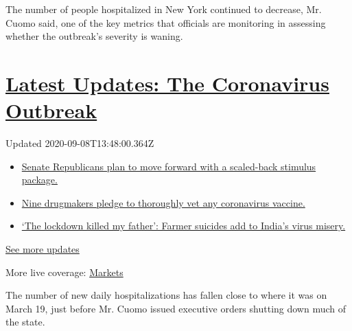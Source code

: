 The number of people hospitalized in New York continued to decrease, Mr.
Cuomo said, one of the key metrics that officials are monitoring in
assessing whether the outbreak's severity is waning.

\hypertarget{latest-updates-the-coronavirus-outbreak}{%
\section{\texorpdfstring{\href{https://www.nytimes3xbfgragh.onion/2020/09/08/world/covid-19-coronavirus.html?action=click\&pgtype=Article\&state=default\&region=MAIN_CONTENT_1\&context=storylines_live_updates}{Latest
Updates: The Coronavirus
Outbreak}}{Latest Updates: The Coronavirus Outbreak}}\label{latest-updates-the-coronavirus-outbreak}}

Updated 2020-09-08T13:48:00.364Z

\begin{itemize}
\tightlist
\item
  \href{https://www.nytimes3xbfgragh.onion/2020/09/08/world/covid-19-coronavirus.html?action=click\&pgtype=Article\&state=default\&region=MAIN_CONTENT_1\&context=storylines_live_updates\#link-547feae1}{Senate
  Republicans plan to move forward with a scaled-back stimulus package.}
\item
  \href{https://www.nytimes3xbfgragh.onion/2020/09/08/world/covid-19-coronavirus.html?action=click\&pgtype=Article\&state=default\&region=MAIN_CONTENT_1\&context=storylines_live_updates\#link-679303d7}{Nine
  drugmakers pledge to thoroughly vet any coronavirus vaccine.}
\item
  \href{https://www.nytimes3xbfgragh.onion/2020/09/08/world/covid-19-coronavirus.html?action=click\&pgtype=Article\&state=default\&region=MAIN_CONTENT_1\&context=storylines_live_updates\#link-1c973131}{`The
  lockdown killed my father': Farmer suicides add to India's virus
  misery.}
\end{itemize}

\href{https://www.nytimes3xbfgragh.onion/2020/09/08/world/covid-19-coronavirus.html?action=click\&pgtype=Article\&state=default\&region=MAIN_CONTENT_1\&context=storylines_live_updates}{See
more updates}

More live coverage:
\href{https://www.nytimes3xbfgragh.onion/live/2020/09/08/business/stock-market-today-coronavirus?action=click\&pgtype=Article\&state=default\&region=MAIN_CONTENT_1\&context=storylines_live_updates}{Markets}

The number of new daily hospitalizations has fallen close to where it
was on March 19, just before Mr. Cuomo issued executive orders shutting
down much of the state.

